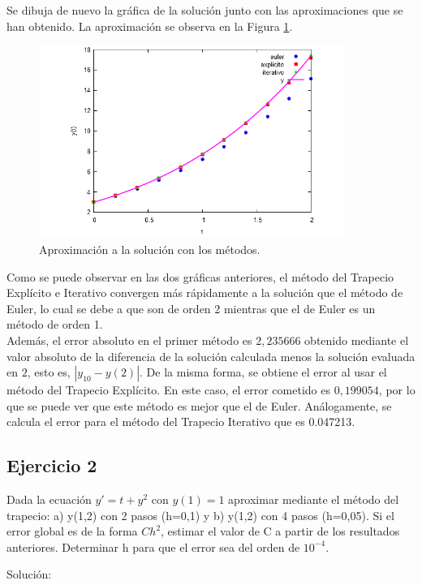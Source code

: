 \documentclass{article}
\theoremstyle{theorem-style}  %
\theoremstyle{definition-style}
\theoremstyle{example-style}
\begin{document}
Se dibuja de nuevo la gráfica de la solución junto con las aproximaciones que se han obtenido. La aproximación se observa en la Figura \ref{fig:aprox2}.

	\begin{figure}[H]
				\centering
				\includegraphics[width=10cm]{./Images/ejtp1-2.png}
				\caption{Aproximación a la solución con los métodos.}
				\label{fig:aprox2}
	\end{figure}

Como se puede observar en las dos gráficas anteriores, el método del Trapecio Explícito e Iterativo convergen más rápidamente a la solución que el método de Euler, lo cual se debe a que son de orden 2 mientras que el de Euler es un método de orden 1.\\

Además, el error absoluto en el primer método es $2,235666$ obtenido mediante el valor absoluto de la diferencia de la solución calculada menos la solución evaluada en $2$, esto es, $|y_{10} - y(2)|$. De la misma forma, se obtiene el error al usar el método del Trapecio Explícito. En este caso, el error cometido es $0,199054$, por lo que se puede ver que este método es mejor que el de Euler. Análogamente, se calcula el error para el método del Trapecio Iterativo que es 0.047213.

\subsection{Ejercicio 2} \label{ejtp2}

Dada la ecuación $y'=t+y^2$ con $y(1)=1$ aproximar mediante el método del trapecio: a) y(1,2) con 2 pasos (h=0,1) y b) y(1,2) con 4 pasos (h=0,05). Si el error global es de la forma $Ch^2$, estimar el valor de C a partir de los resultados anteriores. Determinar h para que el error sea del orden de $10^{-4}$.

Solución:
\end{document}
